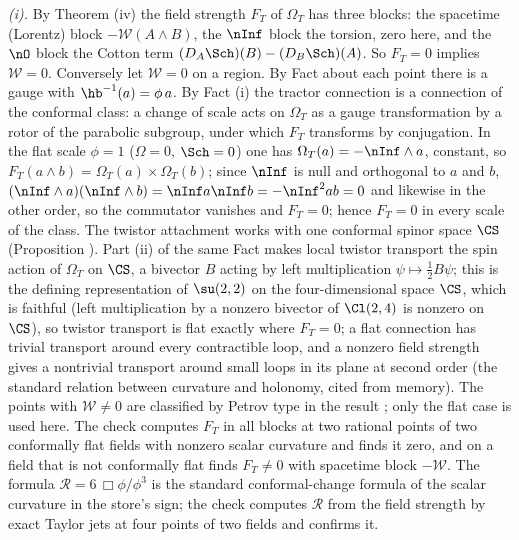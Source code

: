 \emph{(i).} By Theorem (iv) the field strength $F_{T}$ of $\Omega_{T}$ has three blocks: the spacetime (Lorentz) block $-\mathcal{W}(A \wedge B)$, the $\nInf$ block the torsion, zero here, and the $\nO$ block the Cotton term $(D_{A}\Sch)(B) - (D_{B}\Sch)(A)$. So $F_{T} = 0$ implies $\mathcal{W} = 0$. Conversely let $\mathcal{W} = 0$ on a region. By Fact  about each point there is a gauge with $\hb^{-1}(a) = \phi\,a$. By Fact (i) the tractor connection is a connection of the conformal class: a change of scale acts on $\Omega_{T}$ as a gauge transformation by a rotor of the parabolic subgroup, under which $F_{T}$ transforms by conjugation. In the flat scale $\phi = 1$ ($\Omega = 0$, $\Sch = 0$) one has $\Omega_{T}(a) = -\nInf \wedge a$, constant, so $F_{T}(a \wedge b) = \Omega_{T}(a) \times \Omega_{T}(b)$; since $\nInf$ is null and orthogonal to $a$ and $b$, $(\nInf \wedge a)(\nInf \wedge b) = \nInf a \nInf b = -\nInf^{2}ab = 0$ and likewise in the other order, so the commutator vanishes and $F_{T} = 0$; hence $F_{T} = 0$ in every scale of the class. The twistor attachment works with one conformal spinor space $\CS$ (Proposition ). Part (ii) of the same Fact makes local twistor transport the spin action of $\Omega_{T}$ on $\CS$, a bivector $B$ acting by left multiplication $\psi \mapsto \tfrac12 B\psi$; this is the defining representation of $\su(2,2)$ on the four-dimensional space $\CS$, which is faithful (left multiplication by a nonzero bivector of $\Cl(2,4)$ is nonzero on $\CS$), so twistor transport is flat exactly where $F_{T} = 0$; a flat connection has trivial transport around every contractible loop, and a nonzero field strength gives a nontrivial transport around small loops in its plane at second order (the standard relation between curvature and holonomy, cited from memory). The points with $\mathcal{W} \neq 0$ are classified by Petrov type in the result ; only the flat case is used here. The check computes $F_{T}$ in all blocks at two rational points of two conformally flat fields with nonzero scalar curvature and finds it zero, and on a field that is not conformally flat finds $F_{T} \neq 0$ with spacetime block $-\mathcal{W}$. The formula $\mathcal{R} = 6\,\Box\phi/\phi^{3}$ is the standard conformal-change formula of the scalar curvature in the store's sign; the check computes $\mathcal{R}$ from the field strength by exact Taylor jets at four points of two fields and confirms it.

